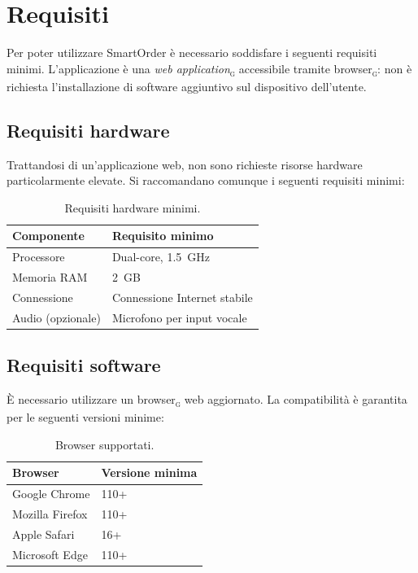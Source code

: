 \documentclass[a4paper, 11pt, oneside]{scrartcl}
\begin{document}
\section{Requisiti}
Per poter utilizzare SmartOrder \`e necessario soddisfare i seguenti requisiti minimi. L'applicazione \`e una \textit{web application}\textsubscript{\textsc{g}} accessibile tramite browser\textsubscript{\textsc{g}}: non \`e richiesta l'installazione di software aggiuntivo sul dispositivo dell'utente.

\subsection{Requisiti hardware}
Trattandosi di un'applicazione web, non sono richieste risorse hardware particolarmente elevate. Si raccomandano comunque i seguenti requisiti minimi:

\begin{table}[H]
    \centering
    \renewcommand{\arraystretch}{1.2}
    \begin{tabular}{ll}
        \toprule
        \textbf{Componente} & \textbf{Requisito minimo} \\
        \midrule
        Processore  & Dual-core, 1.5~GHz \\
        Memoria RAM & 2~GB \\
        Connessione & Connessione Internet stabile \\
        Audio (opzionale) & Microfono per input vocale \\
        \bottomrule
    \end{tabular}
    \caption{Requisiti hardware minimi.}
    \label{tab:req-hw}
\end{table}

\subsection{Requisiti software}
\`E necessario utilizzare un browser\textsubscript{\textsc{g}} web aggiornato. La compatibilit\`a \`e garantita per le seguenti versioni minime:

\begin{table}[H]
    \centering
    \renewcommand{\arraystretch}{1.2}
    \begin{tabular}{ll}
        \toprule
        \textbf{Browser} & \textbf{Versione minima} \\
        \midrule
        Google Chrome   & 110+ \\
        Mozilla Firefox & 110+ \\
        Apple Safari    & 16+ \\
        Microsoft Edge  & 110+ \\
        \bottomrule
    \end{tabular}
    \caption{Browser supportati.}
    \label{tab:req-browser}
\end{table}
\end{document}
